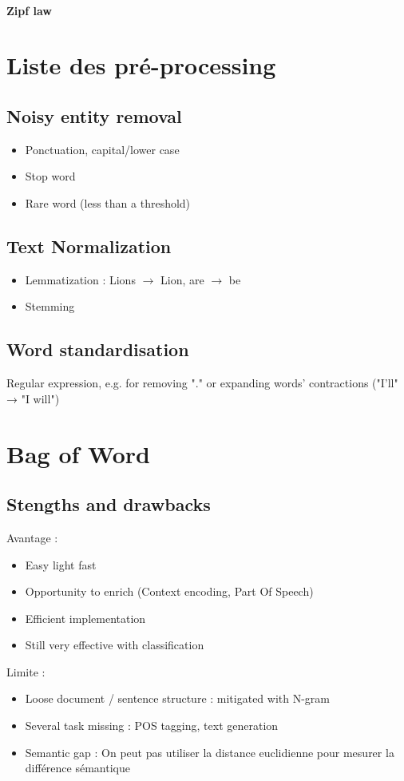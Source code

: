 \documentclass{article}
\theoremstyle{plain}%
\theoremstyle{definition}
\theoremstyle{remark}
\begin{document}
\paragraph*{Zipf law}


\section{Liste des pré-processing}
\subsection{Noisy entity removal}
\begin{itemize}
    \item Ponctuation, capital/lower case
    \item Stop word 
    \item Rare word (less than a threshold)
\end{itemize}

\subsection{Text Normalization}
\begin{itemize}
    \item Lemmatization : Lions $\rightarrow$ Lion, are $\rightarrow$ be
    \item Stemming
\end{itemize}

\subsection{Word standardisation}
Regular expression, e.g. for removing "." or expanding words’ contractions ("I’ll" → "I will")


\section{Bag of Word}

\subsection{Stengths and drawbacks}
Avantage : 
\begin{itemize}
    \item Easy light fast 
    \item Opportunity to enrich (Context encoding, Part Of Speech)
    \item Efficient implementation
    \item Still very effective with classification
\end{itemize}
Limite : 
\begin{itemize}
    \item Loose document / sentence structure : mitigated with N-gram
    \item Several task missing : POS tagging, text generation
    \item Semantic gap : On peut pas utiliser la distance euclidienne pour mesurer la différence sémantique
\end{itemize}
\end{document}
